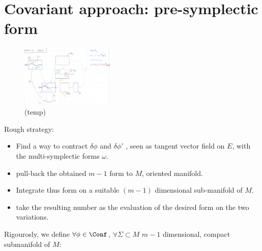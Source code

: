 \documentclass[a4paper,12pt]{scrartcl}  %
\begin{document}
\newpage
\section{Covariant approach: pre-symplectic form}
\begin{figure}
\centering
\includegraphics[width=0.40\textwidth]{Pictures/symform.png}
  \caption{(temp)}
\end{figure}

Rough strategy:
\begin{itemize}
	\item Find a way to contract $\delta \phi$ and $\delta \phi '$ , seen as tangent vector field on $E$, with the multi-symplectic forms $\omega$.
	\item pull-back the obtained $m-1$ form to $M$, oriented manifold.
	\item Integrate thus form on a suitable $(m-1)$ dimensional sub-manifold of $M$.
	\item take the resulting number as the evaluation of the desired form on the two variations.  
\end{itemize}

Rigourosly, we define $\forall \phi \in \Conf$, $\forall \Sigma \subset M$ $m-1$ dimensional, compact submanifold of $M$:
\end{document}
